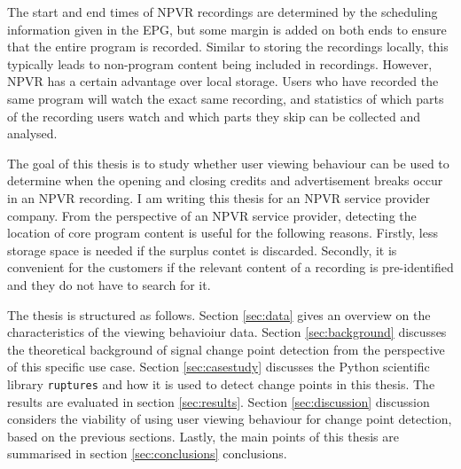 The start and end times of NPVR recordings are determined by the scheduling information given in the EPG, but some margin is added on both ends to ensure that the entire program is recorded. Similar to storing the recordings locally, this typically leads to non-program content being included in recordings. However, NPVR has a certain advantage over local storage. Users who have recorded the same program will watch the exact same recording, and statistics of which parts of the recording users watch and which parts they skip can be collected and analysed.

The goal of this thesis is to study whether user viewing behaviour can be used to determine when the opening and closing credits and advertisement breaks occur in an NPVR recording. I am writing this thesis for an NPVR service provider company. From the perspective of an NPVR service provider, detecting the location of core program content is useful for the following reasons. Firstly, less storage space is needed if the surplus contet is discarded. Secondly, it is convenient for the customers if the relevant content of a recording is pre-identified and they do not have to search for it. %


The thesis is structured as follows. Section \ref{sec:data} gives an overview on the characteristics of the viewing behavioiur data. Section \ref{sec:background} discusses the theoretical background of signal change point detection from the perspective of this specific use case. %
Section \ref{sec:casestudy} discusses the Python scientific library \texttt{ruptures} and how it is used to detect change points in this thesis. The results are evaluated in section \ref{sec:results}. Section \ref{sec:discussion} discussion considers the viability of using user viewing behaviour for change point detection, based on the previous sections. Lastly, the main points of this thesis are summarised in section \ref{sec:conclusions} conclusions.

